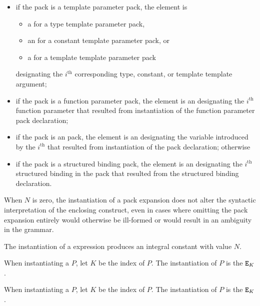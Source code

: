 \begin{itemize}
\item
if the pack is a template parameter pack, the element is
\begin{itemize}
\item
a  for a type template parameter pack,
\item
an  for a constant template parameter pack, or
\item
a  for a template template parameter pack
\end{itemize}
designating the $i^\text{th}$ corresponding
type, constant, or template template argument;

\item
if the pack is a function parameter pack, the element is an
designating the $i^\text{th}$ function parameter
that resulted from instantiation of
the function parameter pack declaration;

\item
if the pack is an  pack,
the element is an 
designating the variable introduced by
the $i^\text{th}$ 
that resulted from instantiation of
the  pack declaration;
otherwise

\item
if the pack is a structured binding pack,
the element is an 
designating the $i^\textrm{th}$ structured binding in the pack
that resulted from the structured binding declaration.
\end{itemize}
When $N$ is zero, the instantiation of a pack expansion
does not alter the syntactic interpretation of the enclosing construct,
even in cases where omitting the pack expansion entirely would
otherwise be ill-formed or would result in an ambiguity in the grammar.

\pnum
The instantiation of a  expression produces
an integral constant with value $N$.

\pnum
When instantiating a  $P$,
let $K$ be the index of $P$.
The instantiation of $P$ is the  $\texttt{\protect E}_K$.

\pnum
When instantiating a  $P$,
let $K$ be the index of $P$.
The instantiation of $P$ is the  $\texttt{\protect E}_K$.

